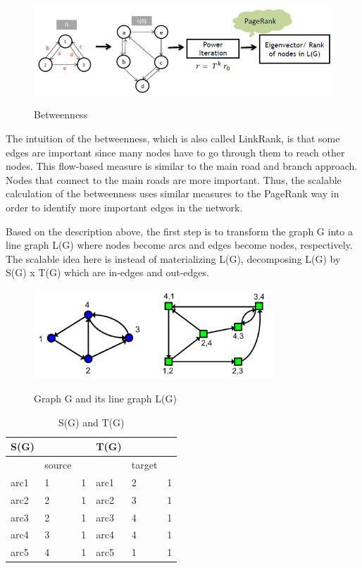 \begin{figure}[H]
	\begin{center}
		\label{fig5}		
		\includegraphics[width=1.0\textwidth]{fig5}	
		\caption{Betweenness}	
	\end{center}
\end{figure}

The intuition of the betweenness, which is also called LinkRank, is that some edges are important since many nodes have to go through them to reach other nodes. This flow-based measure is similar to the main road and branch approach. Nodes that connect to the main roads are more important. Thus, the scalable calculation of the betweenness uses similar measures to the PageRank way in order to identify more important edges in the network.

Based on the description above, the first step is to transform the graph G into a line graph L(G) where nodes become arcs and edges become nodes, respectively. The scalable idea here is instead of materializing L(G), decomposing L(G) by S(G) x T(G) which are in-edges and out-edges. 

\begin{figure}[H]
	\begin{center}
		\label{fig6}		
		\includegraphics[width=0.8\textwidth]{fig6}	
		\caption{Graph G and its line graph L(G)}	
	\end{center}
\end{figure}

\begin{table}[t]
	\caption{S(G) and T(G)}
	\label{t1}
	\begin{center}
		\begin{tabular}{|l|l|l|l|l|l|}
			\hline
			S(G)	&	&	&T(G)	&	&	\\ \hline
				&source	&	&	&target	&	\\	\hline
			arc1	&1	&1	&arc1	&2	&1	\\ \hline
			arc2	&2	&1	&arc2	&3	&1	\\ \hline
			arc3	&2	&1	&arc3	&4	&1	\\ \hline
			arc4	&3	&1	&arc4	&4	&1	\\ \hline
			arc5	&4	&1	&arc5	&1	&1	\\ \hline
		\end{tabular}
	\end{center}
\end{table}

